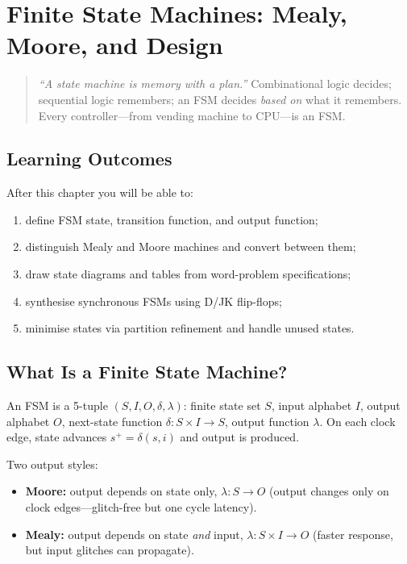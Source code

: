 \chapter{Finite State Machines: Mealy, Moore, and Design}
\label{ch:fsm}

\begin{quote}
\emph{``A state machine is memory with a plan.''}
Combinational logic decides; sequential logic remembers; an FSM decides \emph{based on}
what it remembers. Every controller---from vending machine to CPU---is an FSM.
\end{quote}

\noindent{}
\vspace{0.4em}

\section*{Learning Outcomes}
After this chapter you will be able to:
\begin{enumerate}[label=(L\arabic*)]
    \item define FSM state, transition function, and output function;
    \item distinguish Mealy and Moore machines and convert between them;
    \item draw state diagrams and tables from word-problem specifications;
    \item synthesise synchronous FSMs using D/JK flip-flops;
    \item minimise states via partition refinement and handle unused states.
\end{enumerate}

\section{What Is a Finite State Machine?}
\label{sec:fsm-def}
An FSM is a 5-tuple $(S,I,O,\delta,\lambda)$: finite state set $S$, input alphabet $I$,
output alphabet $O$, next-state function $\delta:S\times I\to S$, output function $\lambda$.
On each clock edge, state advances $s^+=\delta(s,i)$ and output is produced.

Two output styles:
\begin{itemize}
    \item \textbf{Moore:} output depends on state only, $\lambda:S\to O$ (output changes only on clock edges---glitch-free but one cycle latency).
    \item \textbf{Mealy:} output depends on state \emph{and} input, $\lambda:S\times I\to O$ (faster response, but input glitches can propagate).
\end{itemize}

